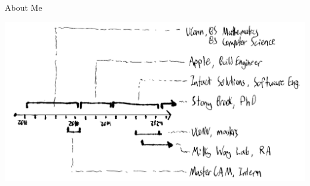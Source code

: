 \begin{frame}{About Me}
  \centering
  \begin{center}
    \includegraphics[width=0.9\linewidth]{aboutme.png}
  \end{center}
\end{frame}
